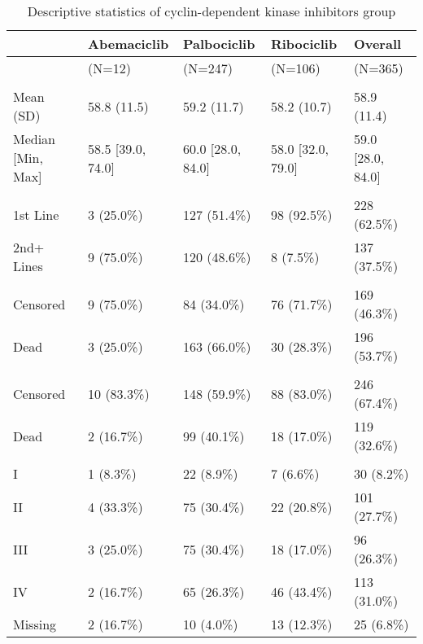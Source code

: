 
\begin{table}
\caption{Descriptive statistics of cyclin-dependent kinase inhibitors group}
\label{tab:stats_ipop_cdk}
\begin{tabular}[t]{lllll}
\toprule
  & Abemaciclib & Palbociclib & Ribociclib & Overall\\
\midrule
 & (N=12) & (N=247) & (N=106) & (N=365)\\
\addlinespace[0.3em]
\multicolumn{5}{l}{\textbf{Age at treatment start}}\\
\hspace{1em}Mean (SD) & 58.8 (11.5) & 59.2 (11.7) & 58.2 (10.7) & 58.9 (11.4)\\
\hspace{1em}Median [Min, Max] & 58.5 [39.0, 74.0] & 60.0 [28.0, 84.0] & 58.0 [32.0, 79.0] & 59.0 [28.0, 84.0]\\
\addlinespace[0.3em]
\multicolumn{5}{l}{\textbf{Treatment Line}}\\
\hspace{1em}1st Line & 3 (25.0\%) & 127 (51.4\%) & 98 (92.5\%) & 228 (62.5\%)\\
\hspace{1em}2nd+ Lines & 9 (75.0\%) & 120 (48.6\%) & 8 (7.5\%) & 137 (37.5\%)\\
\addlinespace[0.3em]
\multicolumn{5}{l}{\textbf{PFS}}\\
\hspace{1em}Censored & 9 (75.0\%) & 84 (34.0\%) & 76 (71.7\%) & 169 (46.3\%)\\
\hspace{1em}Dead & 3 (25.0\%) & 163 (66.0\%) & 30 (28.3\%) & 196 (53.7\%)\\
\addlinespace[0.3em]
\multicolumn{5}{l}{\textbf{OS}}\\
\hspace{1em}Censored & 10 (83.3\%) & 148 (59.9\%) & 88 (83.0\%) & 246 (67.4\%)\\
\hspace{1em}Dead & 2 (16.7\%) & 99 (40.1\%) & 18 (17.0\%) & 119 (32.6\%)\\
\addlinespace[0.3em]
\multicolumn{5}{l}{\textbf{Stage}}\\
\hspace{1em}I & 1 (8.3\%) & 22 (8.9\%) & 7 (6.6\%) & 30 (8.2\%)\\
\hspace{1em}II & 4 (33.3\%) & 75 (30.4\%) & 22 (20.8\%) & 101 (27.7\%)\\
\hspace{1em}III & 3 (25.0\%) & 75 (30.4\%) & 18 (17.0\%) & 96 (26.3\%)\\
\hspace{1em}IV & 2 (16.7\%) & 65 (26.3\%) & 46 (43.4\%) & 113 (31.0\%)\\
\hspace{1em}Missing & 2 (16.7\%) & 10 (4.0\%) & 13 (12.3\%) & 25 (6.8\%)\\
\bottomrule
\end{tabular}
\end{table}


